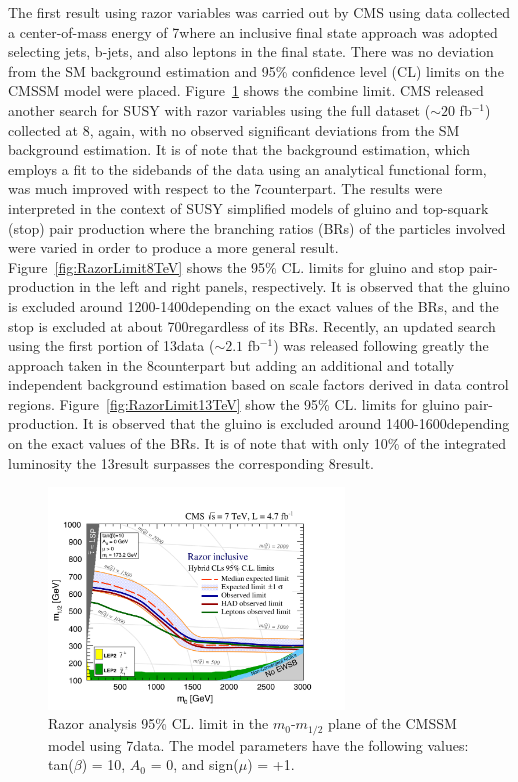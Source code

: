 The first result using razor variables was carried out by CMS using data
collected a center-of-mass energy of 7\TeV where an inclusive final
state approach was adopted selecting jets, b-jets, and also leptons in
the final state. There was no deviation from the SM background
estimation and 95\% confidence level (CL) limits on the CMSSM model
were placed. Figure~\ref{fig:Limit7TeV} shows the combine limit.
CMS released another search for SUSY with razor variables using the full
dataset ($\sim 20$ fb$^{-1}$) collected at 8\TeV, again, with no observed significant
deviations from the SM background estimation. It is of note that the
background estimation, which employs a fit to the sidebands of the
data using an analytical functional form, was much improved with
respect to the 7\TeV counterpart. The results were interpreted in the
context of SUSY simplified models of gluino and top-squark (stop) pair
production where the branching ratios (BRs) of the particles involved
were varied in order to produce a more general
result. Figure~\ref{fig:RazorLimit8TeV} shows the 95\% CL. limits for
gluino and stop pair-production in the left and right panels,
respectively. It is observed that the gluino is excluded around
1200-1400\GeV depending on the exact values of the BRs, and the stop is
excluded at about 700\GeV regardless of its BRs. Recently, an updated
search using the first portion of 13\TeV data ($\sim 2.1$ fb$^{-1}$) was released following
greatly the approach taken in the 8\TeV counterpart but adding an
additional and totally independent background estimation based on scale
factors derived in data control
regions. Figure~\ref{fig:RazorLimit13TeV} show the 95\% CL. limits for
gluino pair-production. It is observed that the gluino is excluded around
1400-1600\GeV depending on the exact values of the BRs. It is of note
that with only 10\% of the integrated luminosity the 13\TeV result
surpasses the corresponding 8\TeV result.
 
\begin{figure}
 \centering
\includegraphics[width=0.7\textwidth]{RazorVariables/Limit7TeV.pdf}
\caption{Razor analysis 95\% CL. limit in the $m_{0}$-$m_{1/2}$
  plane of the CMSSM model using 7\TeV data. The model parameters have the following values: tan($\beta$) =
  10, $A_{0}$ = 0, and sign($\mu$) = +1.\label{fig:Limit7TeV}}
\end{figure} 

